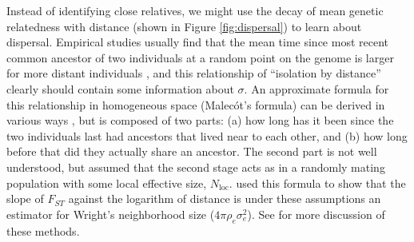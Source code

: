 \documentclass{ar-1col}
\begin{document}
Instead of identifying close relatives,
we might use the decay of mean genetic relatedness with distance 
(shown in Figure \ref{fig:dispersal}) 
to learn about dispersal.
Empirical studies usually find that
the mean time since most recent common ancestor 
of two individuals at a random point on the genome
is larger for more distant individuals \citep{epperson2003geographical,charlesworth2003effects,sexton2013genetic},
and this relationship  of ``isolation by distance'' 
clearly should contain some information about $\sigma$.
An approximate formula for this relationship
in homogeneous space (Malec\'ot's formula)
can be derived in various ways 
\citep{malecot, sawyer1976branching, barton1995genealogies, rousset_1997, barton-depaulis-etheridge, robledoarnuncio2010isolation, ringbauer2017inferring, alasadi2018estimating},
but is composed of two parts: 
(a) how long has it been since the two individuals last had ancestors that lived near to each other,
and (b) how long before that did they actually share an ancestor.
The second part is not well understood,
but \citet{malecot} assumed that the second stage acts as in a randomly mating population
with some local effective size, $N_\text{loc}$.
\citet{rousset_1997} used this formula to show that
the slope of $F_{ST}$ against the logarithm of distance
is under these assumptions an estimator for Wright's neighborhood size ($4 \pi \rho_e \sigma_e^2$).
See \citet{barton1995genealogies} for more discussion of these methods.
\end{document}
